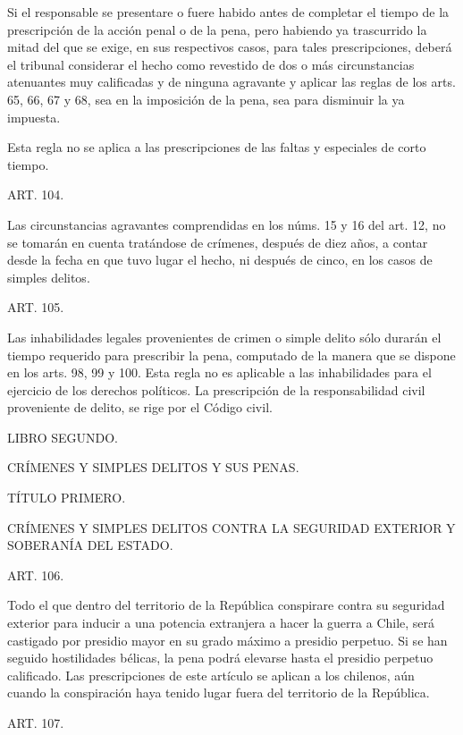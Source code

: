     Si el responsable se presentare o fuere habido antes de completar el tiempo de la prescripción de la acción penal o de la pena, pero habiendo ya trascurrido la mitad del que se exige, en sus respectivos casos, para tales prescripciones, deberá el tribunal considerar el hecho como revestido de dos o más circunstancias atenuantes muy calificadas y de ninguna agravante y aplicar las reglas de los arts. 65, 66, 67 y 68, sea en la imposición de la pena, sea para disminuir la ya impuesta.

    Esta regla no se aplica a las prescripciones de las faltas y especiales de corto tiempo.

    ART. 104.

    Las circunstancias agravantes comprendidas en los núms. 15 y 16 del art. 12, no se tomarán en cuenta tratándose de crímenes, después de diez años, a contar desde la fecha en que tuvo lugar el hecho, ni después de cinco, en los casos de simples delitos.


    ART. 105.

    Las inhabilidades legales provenientes de crimen o simple delito sólo durarán el tiempo requerido para prescribir la pena, computado de la manera que se dispone en los arts. 98, 99 y 100. Esta regla no es aplicable a las inhabilidades para el ejercicio de los derechos políticos.
    La prescripción de la responsabilidad civil proveniente de delito, se rige por el Código civil.




    LIBRO SEGUNDO.

    CRÍMENES Y SIMPLES DELITOS Y SUS PENAS.





    TÍTULO PRIMERO.

    CRÍMENES Y SIMPLES DELITOS CONTRA LA SEGURIDAD EXTERIOR Y SOBERANÍA DEL ESTADO.




    ART. 106.

    Todo el que dentro del territorio de la República conspirare contra su seguridad exterior para inducir a una potencia extranjera a hacer la guerra a Chile, será castigado por presidio mayor en su grado máximo a presidio perpetuo. Si se han seguido hostilidades bélicas, la pena podrá elevarse hasta el presidio perpetuo calificado.
    Las prescripciones de este artículo se aplican a los chilenos, aún cuando la conspiración haya tenido lugar fuera del territorio de la República.

    ART. 107.

